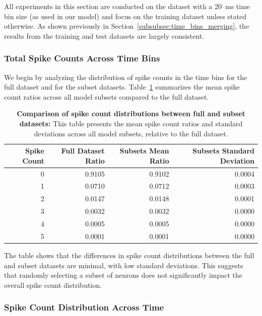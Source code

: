 All experiments in this section are conducted on the dataset with a 20~ms time bin size (as used in our model) and focus on the training dataset unless stated otherwise. As shown previously in Section~\ref{subsubsec:time_bins_merging}, the results from the training and test datasets are largely consistent.

\subsubsection{Total Spike Counts Across Time Bins}
\label{subsubsec:total_spike_counts_subset}
We begin by analyzing the distribution of spike counts in the time bins for the full dataset and for the subset datasets. Table~\ref{tab:subset_spike_count_distribution} summarizes the mean spike count ratios across all model subsets compared to the full dataset.

\begin{table}
    \centering\footnotesize\sf
    \begin{tabular}{rrrr}
        \toprule
        Spike Count & Full Dataset Ratio & Subsets Mean Ratio & Subsets Standard Deviation \\
        \midrule
        0 & 0.9105 & 0.9102 & 0.0004 \\
        1 & 0.0710 & 0.0712 & 0.0003 \\
        2 & 0.0147 & 0.0148 & 0.0001 \\
        3 & 0.0032 & 0.0032 & 0.0000 \\
        4 & 0.0005 & 0.0005 & 0.0000 \\
        5 & 0.0001 & 0.0001 & 0.0000 \\
        \bottomrule
    \end{tabular}
    \caption{\textbf{Comparison of spike count distributions between full and subset datasets:} This table presents the mean spike count ratios and standard deviations across all model subsets, relative to the full dataset.}
    \label{tab:subset_spike_count_distribution}
\end{table}

The table shows that the differences in spike count distributions between the full and subset datasets are minimal, with low standard deviations. This suggests that randomly selecting a subset of neurons does not significantly impact the overall spike count distribution.

\subsubsection{Spike Count Distribution Across Time}
\label{subsubsec:spike_time_distribution_subset}


